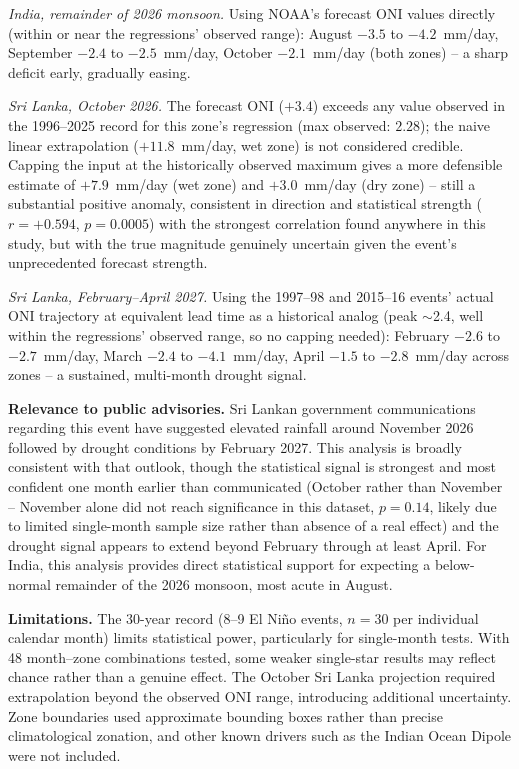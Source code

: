 \documentclass{article}
\begin{document}
\emph{India, remainder of 2026 monsoon.} Using NOAA's forecast ONI values directly
(within or near the regressions' observed range): August $-3.5$ to $-4.2$~mm/day,
September $-2.4$ to $-2.5$~mm/day, October $-2.1$~mm/day (both zones) -- a sharp
deficit early, gradually easing.

\emph{Sri Lanka, October 2026.} The forecast ONI ($+3.4$) exceeds any value observed
in the 1996--2025 record for this zone's regression (max observed: $2.28$); the naive
linear extrapolation ($+11.8$~mm/day, wet zone) is not considered credible. Capping the
input at the historically observed maximum gives a more defensible estimate of
$+7.9$~mm/day (wet zone) and $+3.0$~mm/day (dry zone) -- still a substantial positive
anomaly, consistent in direction and statistical strength ($r=+0.594$, $p=0.0005$)
with the strongest correlation found anywhere in this study, but with the true
magnitude genuinely uncertain given the event's unprecedented forecast strength.

\emph{Sri Lanka, February--April 2027.} Using the 1997--98 and 2015--16 events' actual
ONI trajectory at equivalent lead time as a historical analog (peak $\sim$2.4, well
within the regressions' observed range, so no capping needed): February $-2.6$ to
$-2.7$~mm/day, March $-2.4$ to $-4.1$~mm/day, April $-1.5$ to $-2.8$~mm/day across
zones -- a sustained, multi-month drought signal.

\textbf{Relevance to public advisories.} Sri Lankan government communications
regarding this event have suggested elevated rainfall around November 2026 followed by
drought conditions by February 2027. This analysis is broadly consistent with that
outlook, though the statistical signal is strongest and most confident one month
earlier than communicated (October rather than November -- November alone did not
reach significance in this dataset, $p=0.14$, likely due to limited single-month
sample size rather than absence of a real effect) and the drought signal appears to
extend beyond February through at least April. For India, this analysis provides
direct statistical support for expecting a below-normal remainder of the 2026 monsoon,
most acute in August.

\textbf{Limitations.} The 30-year record (8--9 El Ni\~{n}o events, $n=30$ per
individual calendar month) limits statistical power, particularly for single-month
tests. With 48 month--zone combinations tested, some weaker single-star results may
reflect chance rather than a genuine effect. The October Sri Lanka projection required
extrapolation beyond the observed ONI range, introducing additional uncertainty. Zone
boundaries used approximate bounding boxes rather than precise climatological
zonation, and other known drivers such as the Indian Ocean Dipole were not included.
\end{document}
